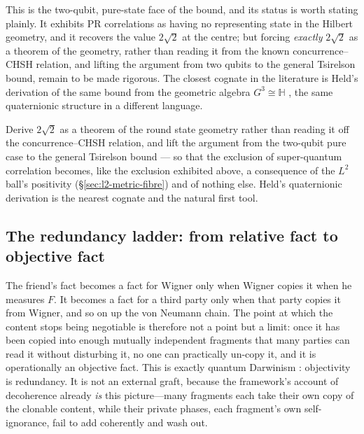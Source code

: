 \noindent This is the two-qubit, pure-state face of the bound, and its status is
worth stating plainly. It exhibits PR correlations as having no representing state
in the Hilbert geometry, and it recovers the value $2\sqrt{2}$ at the centre; but
forcing \emph{exactly} $2\sqrt{2}$ as a theorem of the geometry, rather than
reading it from the known concurrence--CHSH relation, and lifting the argument
from two qubits to the general Tsirelson bound, remain to be made rigorous. The
closest cognate in the literature is Held's derivation of the same bound from the
geometric algebra $G^{3}\cong\mathbb{H}$ \autocite{Held2021}, the same
quaternionic structure in a different language.

\begin{openproblem}\label{op:tsirelson-geometry}
Derive $2\sqrt{2}$ as a theorem of the round state geometry rather than reading it off the
concurrence--CHSH relation, and lift the argument from the two-qubit pure case to the general
Tsirelson bound --- so that the exclusion of super-quantum correlation becomes, like the exclusion
exhibited above, a consequence of the $L^{2}$ ball's positivity (\S\ref{sec:l2-metric-fibre}) and
of nothing else. Held's quaternionic derivation \autocite{Held2021} is the nearest cognate and the
natural first tool.
\end{openproblem}



\subsection{The redundancy ladder: from relative fact to objective fact}
\label{sec:wf-redundancy}

The friend's fact becomes a fact for Wigner only when Wigner copies it when he
measures $F$. It becomes a fact for a third party only when that party copies it
from Wigner, and so on up the von Neumann chain. The point at which the content
stops being negotiable is therefore not a point but a limit: once it has been
copied into enough mutually independent fragments that many parties can read it
without disturbing it, no one can practically un-copy it, and it is operationally
an objective fact. This is exactly quantum Darwinism \autocite{zurek_2009}:
objectivity is redundancy. It is not an external graft, because the framework's
account of decoherence already \emph{is} this picture---many fragments each take
their own copy of the clonable content, while their private phases, each
fragment's own self-ignorance, fail to add coherently and wash out.

